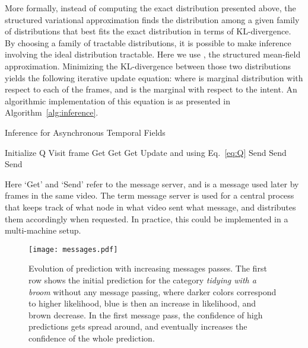 \documentclass[10pt,twocolumn,letterpaper]{article}
\begin{document}
More formally, instead of computing the exact distribution  presented above, the structured variational approximation finds the distribution  among a given family of distributions that best fits the exact distribution in terms of KL-divergence. By choosing a family of tractable distributions, it is possible to make inference involving the ideal distribution tractable. Here we use , the structured mean-field approximation. Minimizing the KL-divergence between those two distributions yields the following iterative update equation:
\begingroup\makeatletter\def\f@size{8}\check@mathfonts
\def\maketag@@@#1{\hbox{\m@th\normalsize\normalfont#1}}
\endgroup
where  is marginal distribution with respect to each of the frames, and  is the marginal with respect to the intent. An algorithmic implementation of this equation is as presented in Algorithm~\ref{alg:inference}.

\begin{algorithm}
  \caption{Inference for Asynchronous Temporal Fields
    \label{alg:inference}}
    {\footnotesize
  \begin{algorithmic}[1]
      \State Initialize Q 
      \While{}
        \State Visit frame 
        \State Get  
        \State Get  
        \State Get  
        \While{}
          \State Update  and  using Eq.~\ref{eq:Q}
        \EndWhile
        \State Send 
        \State Send 
        \State Send 
      \EndWhile
  \end{algorithmic}
  }
\end{algorithm}


\noindent Here `Get' and `Send' refer to the message server, and  is a message used later by frames in the same video. The term message server is used for a central process that keeps track of what node in what video sent what message, and distributes them accordingly when requested. In practice, this could be implemented in a multi-machine setup.

\begin{figure}
\centering
\texttt{[image: messages.pdf]}
\caption{Evolution of prediction with increasing messages passes. The first row shows the initial prediction for the category {\em tidying with a broom} without any message passing, where darker colors correspond to higher likelihood, blue is then an increase in likelihood, and brown decrease. In the first message pass, the confidence of high predictions gets spread around, and eventually increases the confidence of the whole prediction.}
\label{fig:messages}
\end{figure}
\end{document}
